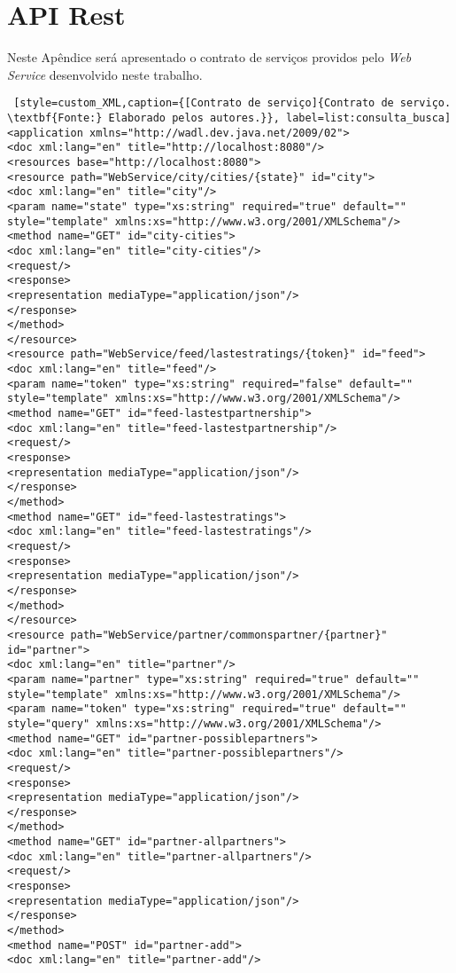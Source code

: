 \chapter*{API Rest}
\label{apendice:api_rest}

Neste Apêndice será apresentado o contrato de serviços providos pelo \textit{Web Service} desenvolvido neste trabalho.

\captionsetup[code]{list=no}
\begin{lstlisting} [style=custom_XML,caption={[Contrato de serviço]{Contrato de serviço. \textbf{Fonte:} Elaborado pelos autores.}}, label=list:consulta_busca] 	
<application xmlns="http://wadl.dev.java.net/2009/02">
<doc xml:lang="en" title="http://localhost:8080"/>
<resources base="http://localhost:8080">
<resource path="WebService/city/cities/{state}" id="city">
<doc xml:lang="en" title="city"/>
<param name="state" type="xs:string" required="true" default="" style="template" xmlns:xs="http://www.w3.org/2001/XMLSchema"/>
<method name="GET" id="city-cities">
<doc xml:lang="en" title="city-cities"/>
<request/>
<response>
<representation mediaType="application/json"/>
</response>
</method>
</resource>
<resource path="WebService/feed/lastestratings/{token}" id="feed">
<doc xml:lang="en" title="feed"/>
<param name="token" type="xs:string" required="false" default="" style="template" xmlns:xs="http://www.w3.org/2001/XMLSchema"/>
<method name="GET" id="feed-lastestpartnership">
<doc xml:lang="en" title="feed-lastestpartnership"/>
<request/>
<response>
<representation mediaType="application/json"/>
</response>
</method>
<method name="GET" id="feed-lastestratings">
<doc xml:lang="en" title="feed-lastestratings"/>
<request/>
<response>
<representation mediaType="application/json"/>
</response>
</method>
</resource>
<resource path="WebService/partner/commonspartner/{partner}" id="partner">
<doc xml:lang="en" title="partner"/>
<param name="partner" type="xs:string" required="true" default="" style="template" xmlns:xs="http://www.w3.org/2001/XMLSchema"/>
<param name="token" type="xs:string" required="true" default="" style="query" xmlns:xs="http://www.w3.org/2001/XMLSchema"/>
<method name="GET" id="partner-possiblepartners">
<doc xml:lang="en" title="partner-possiblepartners"/>
<request/>
<response>
<representation mediaType="application/json"/>
</response>
</method>
<method name="GET" id="partner-allpartners">
<doc xml:lang="en" title="partner-allpartners"/>
<request/>
<response>
<representation mediaType="application/json"/>
</response>
</method>
<method name="POST" id="partner-add">
<doc xml:lang="en" title="partner-add"/>

\end{lstlisting}
